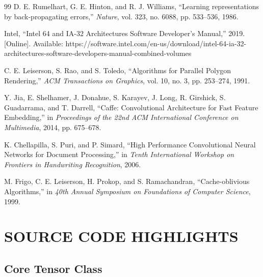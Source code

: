 \documentclass[12pt,oneside,a4paper]{report}
\begin{document}
\begin{thebibliography}{99}
 D. E. Rumelhart, G. E. Hinton, and R. J. Williams, ``Learning representations by back-propagating errors,'' \textit{Nature}, vol. 323, no. 6088, pp. 533--536, 1986.

 Intel, ``Intel 64 and IA-32 Architectures Software Developer's Manual,'' 2019. [Online]. Available: https://software.intel.com/en-us/download/intel-64-ia-32-architectures-software-developers-manual-combined-volumes

 C. E. Leiserson, S. Rao, and S. Toledo, ``Algorithms for Parallel Polygon Rendering,'' \textit{ACM Transactions on Graphics}, vol. 10, no. 3, pp. 253--274, 1991.

 Y. Jia, E. Shelhamer, J. Donahue, S. Karayev, J. Long, R. Girshick, S. Guadarrama, and T. Darrell, ``Caffe: Convolutional Architecture for Fast Feature Embedding,'' in \textit{Proceedings of the 22nd ACM International Conference on Multimedia}, 2014, pp. 675--678.

 K. Chellapilla, S. Puri, and P. Simard, ``High Performance Convolutional Neural Networks for Document Processing,'' in \textit{Tenth International Workshop on Frontiers in Handwriting Recognition}, 2006.

 M. Frigo, C. E. Leiserson, H. Prokop, and S. Ramachandran, ``Cache-oblivious Algorithms,'' in \textit{40th Annual Symposium on Foundations of Computer Science}, 1999.

\end{thebibliography}

\newpage

\appendix
\chapter{SOURCE CODE HIGHLIGHTS}

\section{Core Tensor Class}
\end{document}
